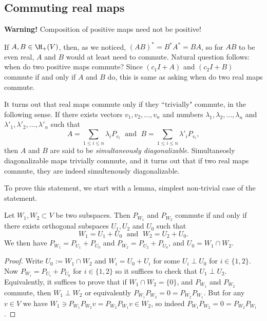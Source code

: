 \subsection{Commuting real maps}

\textbf{Warning!} Composition of positive maps need not be positive!

If $A, B \in \H_{+}(V)$, then, as we noticed, $(A B)^{*} = B^{*} A^{*} = B A$, so for $A B$ to be even real, $A$ and $B$ would at least need to commute. Natural question follows: when do two positive maps commute? Since $(c_{1} I + A)$ and $(c_{2} I + B)$ commute if and only if $A$ and $B$ do, this is same as asking when do two real maps commute.

It turns out that real maps commute only if they ``trivially" commute, in the following sense. If there exists vectors $v_{1}, v_{2}, \ldots, v_{n}$ and numbers $\lambda_{1}, \lambda_{2}, \ldots, \lambda_{n}$ and $\lambda'_{1}, \lambda'_{2}, \ldots, \lambda'_{n}$ such that
\[
	A = \sum_{1 \leq i \leq n} \lambda_{i} P_{v_{i}} \; \text{ and } \; B = \sum_{1 \leq i \leq n} \lambda'_{i} P_{v_{i}},
\]
then $A$ and $B$ are said to be \textit{simultaneously diagonalizable}. Simultaneosly diagonalizable maps trivially commute, and it turns out that if two real maps commute, they are indeed simultenously diagonalizable.

To prove this statement, we start with a lemma, simplest non-trivial case of the statement.

\begin{lem}\label{projectionLemma}
	Let $W_{1}, W_{2} \subset V$ be two subspaces. Then $P_{W_{1}}$ and $P_{W_{2}}$ commute if and only if there exists orthogonal subspaces $U_{1}, U_{2}$ and $U_{0}$ such that
	\[
		W_{1} = U_{1} + U_{0}  \; \text{ and } \; W_{2} = U_{2} + U_{0}.
	\]
	We then have $P_{W_{1}} = P_{U_{1}} + P_{U_{0}}$ and $P_{W_{2}} = P_{U_{2}} + P_{U_{0}}$, and $U_{0} = W_{1} \cap W_{2}$.
\end{lem}
\begin{proof}
	Write $U_{0} := W_{1} \cap W_{2}$ and $W_{i} = U_{0} + U_{i}$ for some $U_{i} \perp U_{0}$ for $i \in \{1, 2\}$. Now $P_{W_{i}} = P_{U_{i}} + P_{U_{0}}$ for $i \in \{1, 2\}$ so it suffices to check that $U_{1} \perp U_{2}$. Equivalently, it suffices to prove that if $W_{1} \cap W_{2} = \{0\}$, and $P_{W_{1}}$ and $P_{W_{2}}$ commute, then $W_{1} \perp W_{2}$ or equivalently $P_{W_{1}}P_{W_{2}} = 0 = P_{W_{2}}P_{W_{1}}$. But for any $v \in V$ we have $W_{1} \ni P_{W_{1}}P_{W_{2}}v = P_{W_{2}}P_{W_{1}}v \in W_{2}$, so indeed $P_{W_{1}}P_{W_{2}} = 0 = P_{W_{2}}P_{W_{1}}$.
\end{proof}

